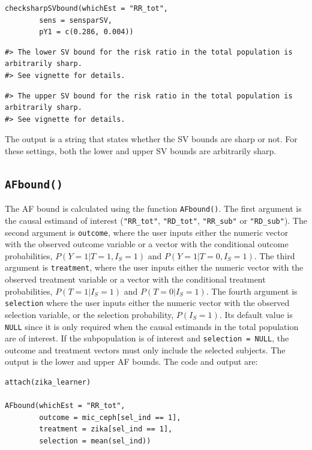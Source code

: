 \begin{verbatim}
checksharpSVbound(whichEst = "RR_tot",
        sens = sensparSV,
        pY1 = c(0.286, 0.004))
\end{verbatim}

\begin{verbatim}
#> The lower SV bound for the risk ratio in the total population is arbitrarily sharp.
#> See vignette for details.
\end{verbatim}

\begin{verbatim}
#> The upper SV bound for the risk ratio in the total population is arbitrarily sharp.
#> See vignette for details.
\end{verbatim}

The output is a string that states whether the SV bounds are sharp or not.
For these settings, both the lower and upper SV bounds are arbitrarily sharp.

\subsection{\texorpdfstring{\texttt{AFbound()}}{AFbound()}}\label{afbound}

The AF bound is calculated using the function \texttt{AFbound()}. The first argument is
the causal estimand of interest (\texttt{"RR\_tot"}, \texttt{"RD\_tot"}, \texttt{"RR\_sub"} or
\texttt{"RD\_sub"}). The second argument is \texttt{outcome}, where the user inputs
either the numeric vector with the observed outcome variable or a vector with
the conditional outcome probabilities, \(P(Y=1|T=1,I_S=1)\) and \(P(Y=1|T=0,I_S=1)\).
The third argument is \texttt{treatment}, where the user inputs either the numeric
vector with the observed treatment variable or a vector with the conditional
treatment probabilities, \(P(T=1|I_S=1)\) and \(P(T=0|I_S=1)\). The fourth argument
is \texttt{selection} where the user inputs either the numeric vector with the observed
selection variable, or the selection probability, \(P(I_S=1)\). Its default value
is \texttt{NULL} since it is only required when the causal estimands in the total
population are of interest. If the subpopulation is of interest and
\texttt{selection\ =\ NULL}, the outcome and treatment vectors must only include the
selected subjects. The output is the lower and upper AF bounds. The code and
output are:

\begin{verbatim}
attach(zika_learner)

AFbound(whichEst = "RR_tot",
        outcome = mic_ceph[sel_ind == 1],
        treatment = zika[sel_ind == 1],
        selection = mean(sel_ind))
\end{verbatim}

